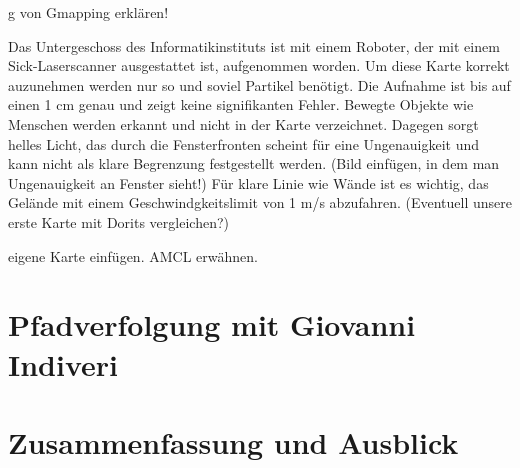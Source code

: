 \documentclass[11pt,a4paper]{article}
\begin{document}
g von Gmapping erklären!


Das Untergeschoss des Informatikinstituts ist mit einem Roboter, der mit einem Sick-Laserscanner ausgestattet ist, aufgenommen worden. Um diese Karte korrekt auzunehmen werden nur so und soviel Partikel ben\"otigt. Die Aufnahme ist bis auf einen 1 cm genau und zeigt keine signifikanten Fehler. Bewegte Objekte wie Menschen werden erkannt und nicht in der Karte verzeichnet. Dagegen sorgt helles Licht, das durch die Fensterfronten scheint f\"ur eine Ungenauigkeit und kann nicht als klare Begrenzung festgestellt werden.
(Bild einfügen, in dem man Ungenauigkeit an Fenster sieht!) F\"ur klare Linie wie W\"ande ist es wichtig, das Gel\"ande mit einem Geschwindgkeitslimit von 1 m/s abzufahren. (Eventuell unsere erste Karte mit Dorits vergleichen?)



eigene Karte einfügen. AMCL erwähnen.


\section{Pfadverfolgung mit Giovanni Indiveri}
\section{Zusammenfassung und Ausblick}




\newpage
{%
	
}
\end{document}
